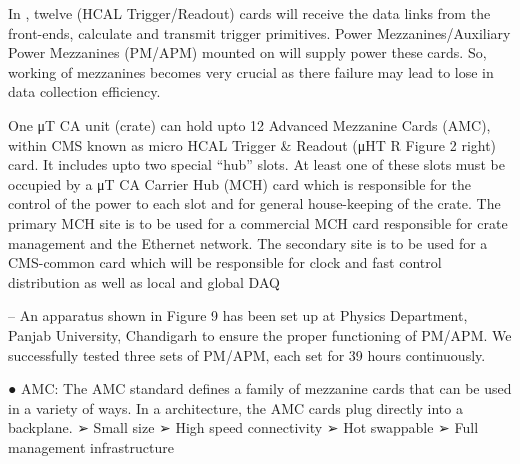 In \mtca, twelve \mhtr (HCAL Trigger/Readout) cards will receive the data links from the front-ends, calculate and transmit trigger primitives. Power Mezzanines/Auxiliary Power Mezzanines (PM/APM) mounted on \mhtr will supply power these cards. So, working of mezzanines becomes very crucial as there failure may lead to lose in data collection efficiency.


One μT CA unit (crate) can hold upto 12 Advanced Mezzanine Cards (AMC), within CMS known
as micro HCAL Trigger \& Readout (μHT R Figure 2 right) card. It includes upto two special “hub”
slots. At least one of these slots must be occupied by a μT CA Carrier Hub (MCH) card which is
responsible for the control of the power to each slot and for general house-keeping of the crate. The
primary MCH site is to be used for a commercial MCH card responsible for crate management and the
Ethernet network. The secondary site is to be used for a CMS-common card which will be responsible
for clock and fast control distribution as well as local and global DAQ


– An apparatus shown in Figure 9 has been set up at Physics Department, Panjab University, Chandigarh to ensure the proper functioning of PM/APM. We successfully tested three sets of PM/APM, each set for 39 hours continuously.

● AMC:
The AMC standard defines a family of mezzanine cards that can be
used in a variety of ways. In a \mtca architecture, the AMC cards plug
directly into a backplane.
➢ Small size
➢ High speed connectivity
➢ Hot swappable
➢ Full management infrastructure


